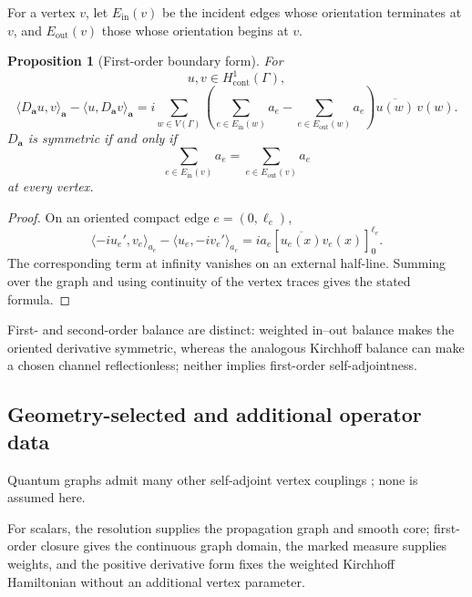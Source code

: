 \documentclass[11pt]{article}
\theoremstyle{plain}
\newtheorem{proposition}[theorem]{Proposition}
\theoremstyle{definition}
\begin{document}
For a vertex \(v\), let \(E_{\mathrm{in}}(v)\) be the incident edges whose orientation terminates at \(v\), and \(E_{\mathrm{out}}(v)\) those whose orientation begins at \(v\).

\begin{proposition}[First-order boundary form]
\label{prop:first-order-boundary-form-general}
For
\[
  u,v\in H^1_{\mathrm{cont}}(\Gamma),
\]
\[
  \langle D_{\mathbf a}u,v\rangle_{\mathbf a}
  -
  \langle u,D_{\mathbf a}v\rangle_{\mathbf a}
  =
  i
  \sum_{w\in V(\Gamma)}
  \left(
    \sum_{e\in E_{\mathrm{in}}(w)}a_e
    -
    \sum_{e\in E_{\mathrm{out}}(w)}a_e
  \right)
  \overline{u(w)}\,v(w).
\]
\(D_{\mathbf a}\) is symmetric if and only if
\[
  \sum_{e\in E_{\mathrm{in}}(v)}a_e
  =
  \sum_{e\in E_{\mathrm{out}}(v)}a_e
\]
at every vertex.
\end{proposition}

\begin{proof}
On an oriented compact edge \(e=(0,\ell_e)\),
\[
  \langle -iu_e',v_e\rangle_{a_e}
  -
  \langle u_e,-iv_e'\rangle_{a_e}
  =
  i a_e
  \left[
    \overline{u_e(x)}v_e(x)
  \right]_{0}^{\ell_e}.
\]
The corresponding term at infinity vanishes on an external half-line.
Summing over the graph and using continuity of the vertex traces gives the
stated formula.
\end{proof}

First- and second-order balance are distinct: weighted in--out balance makes the oriented derivative symmetric, whereas the analogous Kirchhoff balance can make a chosen channel reflectionless; neither implies first-order self-adjointness.

\subsection{Geometry-selected and additional operator data}
\label{subsec:geometry-versus-vertex-data}

Quantum graphs admit many other self-adjoint vertex couplings \citep{KostrykinSchrader99,BerkolaikoKuchment2013}; none is assumed here.

For scalars, the resolution supplies the propagation graph and smooth core; first-order closure gives the continuous graph domain, the marked measure supplies weights, and the positive derivative form fixes the weighted Kirchhoff Hamiltonian without an additional vertex parameter.
\end{document}
